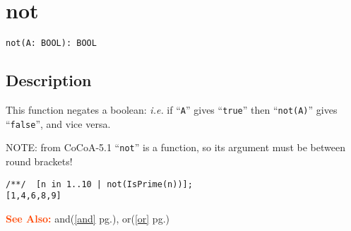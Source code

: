 \documentclass[a4paper]{mybook}
\newenvironment{command}{}{} %
\newcommand\SeeAlso{\par\textcolor{OrangeRed}{\textbf{\large See Also: }}}
\begin{document}
\section{not}
\label{not}
\begin{command} %


\begin{Verbatim}[label=syntax, rulecolor=\color{MidnightBlue},
frame=single]
not(A: BOOL): BOOL
\end{Verbatim}


\subsection*{Description}

This function negates a boolean: \textit{i.e.} if ``\verb&A&'' gives ``\verb&true&''
then ``\verb&not(A)&'' gives ``\verb&false&'', and vice versa.
\par 
NOTE: from CoCoA-5.1 ``\verb&not&'' is a function, so its argument must be
between round brackets!
\begin{Verbatim}[label=example, rulecolor=\color{PineGreen}, frame=single]
/**/  [n in 1..10 | not(IsPrime(n))];
[1,4,6,8,9]
\end{Verbatim}


\SeeAlso %
  and(\ref{and} pg.\pageref{and}), 
    or(\ref{or} pg.\pageref{or})
\end{command} %
\end{document}
